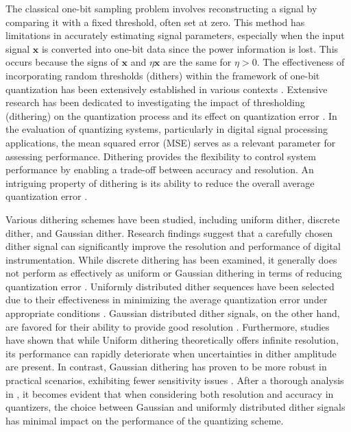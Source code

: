 \documentclass[12pt,draftcls,onecolumn]{IEEEtran}
\begin{document}
The classical one-bit sampling problem involves reconstructing a signal by comparing it with a fixed threshold, often set at zero. This method has limitations in accurately estimating signal parameters, especially when the input signal $\mathbf{x}$ is converted into one-bit data since the power information is lost. This occurs because the signs of $\mathbf{x}$ and $\eta\mathbf{x}$ are the same for $\eta>0$. The effectiveness of incorporating random thresholds (dithers) within the framework of one-bit quantization has been extensively established in various contexts \cite{dabeer2006signal,rousseau2003nonlinear}.
Extensive research has been dedicated to investigating the impact of thresholding (dithering) on the quantization process and its effect on quantization error \cite{schuchman1964dither, vanderkooy1987dither,  wagdy1989validity,gray1993dithered,   carbone1997quantitative, ali202012}. In the evaluation of quantizing systems, particularly in digital signal processing applications, the mean squared error (MSE) serves as a relevant parameter for assessing performance. Dithering provides the flexibility to control system performance by enabling a trade-off between accuracy and resolution. An intriguing property of dithering is its ability to reduce the overall average quantization error \cite{carbone1997quantitative}.

Various dithering schemes have been studied, including uniform dither, discrete dither, and Gaussian dither. Research findings suggest that a carefully chosen dither signal can significantly improve the resolution and performance of digital instrumentation. While discrete dithering has been examined, it generally does not perform as effectively as uniform or Gaussian dithering in terms of reducing quantization error \cite{carbone1997quantitative}.
Uniformly distributed dither sequences have been selected due to their effectiveness in minimizing the average quantization error under appropriate conditions \cite{schuchman1964dither}. Gaussian distributed dither signals, on the other hand, are favored for their ability to provide good resolution \cite{carbone1994effect, wagdy1989effect}. Furthermore, studies have shown that while Uniform dithering theoretically offers infinite resolution, its performance can rapidly deteriorate when uncertainties in dither amplitude are present. In contrast, Gaussian dithering has proven to be more robust in practical scenarios, exhibiting fewer sensitivity issues \cite{wagdy1989effect, xi2020gridless}. After a thorough analysis in \cite{carbone1997quantitative}, it becomes evident that when considering both resolution and accuracy in quantizers, the choice between Gaussian and uniformly distributed dither signals has minimal impact on the performance of the quantizing scheme.
\end{document}
